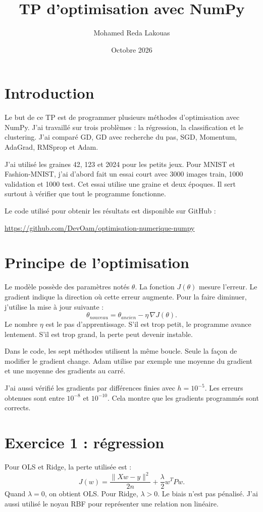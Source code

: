 \documentclass[11pt,a4paper]{article}
\title{TP d'optimisation avec NumPy}
\author{Mohamed Reda Lakouas}
\date{Octobre 2026}
\begin{document}
\maketitle

\section{Introduction}
Le but de ce TP est de programmer plusieurs méthodes d'optimisation avec NumPy.
J'ai travaillé sur trois problèmes : la régression, la classification et le
clustering. J'ai comparé GD, GD avec recherche du pas, SGD, Momentum, AdaGrad,
RMSprop et Adam.

J'ai utilisé les graines 42, 123 et 2024 pour les petits jeux. Pour MNIST et
Fashion-MNIST, j'ai d'abord fait un essai court avec 3000 images train, 1000
validation et 1000 test. Cet essai utilise une graine et deux époques. Il sert
surtout à vérifier que tout le programme fonctionne.

Le code utilisé pour obtenir les résultats est disponible sur GitHub :
\begin{center}
\url{https://github.com/DevOam/optimisation-numerique-numpy}
\end{center}

\section{Principe de l'optimisation}
Le modèle possède des paramètres notés $\theta$. La fonction $J(\theta)$ mesure
l'erreur. Le gradient indique la direction où cette erreur augmente. Pour la
faire diminuer, j'utilise la mise à jour suivante :
\[
\theta_{nouveau}=\theta_{ancien}-\eta\,\nabla J(\theta).
\]
Le nombre $\eta$ est le pas d'apprentissage. S'il est trop petit, le programme
avance lentement. S'il est trop grand, la perte peut devenir instable.

Dans le code, les sept méthodes utilisent la même boucle. Seule la façon de
modifier le gradient change. Adam utilise par exemple une moyenne du gradient
et une moyenne des gradients au carré.

J'ai aussi vérifié les gradients par différences finies avec $h=10^{-5}$.
Les erreurs obtenues sont entre $10^{-8}$ et $10^{-10}$. Cela montre que les
gradients programmés sont corrects.

\section{Exercice 1 : régression}
Pour OLS et Ridge, la perte utilisée est :
\[
J(w)=\frac{\lVert Xw-y\rVert^2}{2n}+\frac{\lambda}{2}w^TPw.
\]
Quand $\lambda=0$, on obtient OLS. Pour Ridge, $\lambda>0$. Le biais n'est pas
pénalisé. J'ai aussi utilisé le noyau RBF pour représenter une relation non
linéaire.
\end{document}
